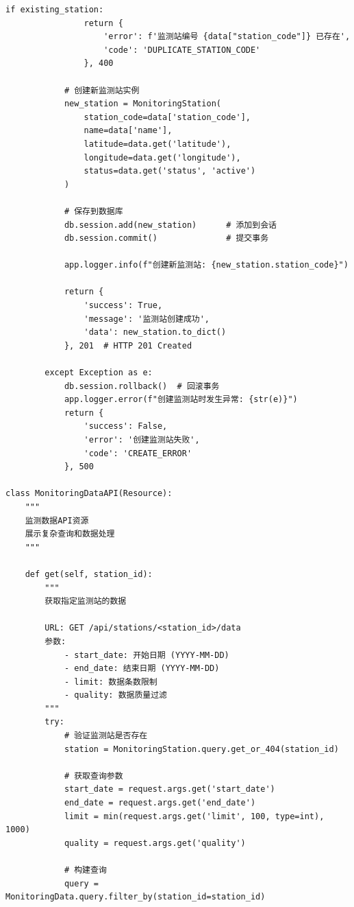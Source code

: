 \begin{lstlisting}[style=python]
            if existing_station:
                return {
                    'error': f'监测站编号 {data["station_code"]} 已存在',
                    'code': 'DUPLICATE_STATION_CODE'
                }, 400
            
            # 创建新监测站实例
            new_station = MonitoringStation(
                station_code=data['station_code'],
                name=data['name'],
                latitude=data.get('latitude'),
                longitude=data.get('longitude'),
                status=data.get('status', 'active')
            )
            
            # 保存到数据库
            db.session.add(new_station)      # 添加到会话
            db.session.commit()              # 提交事务
            
            app.logger.info(f"创建新监测站: {new_station.station_code}")
            
            return {
                'success': True,
                'message': '监测站创建成功',
                'data': new_station.to_dict()
            }, 201  # HTTP 201 Created
            
        except Exception as e:
            db.session.rollback()  # 回滚事务
            app.logger.error(f"创建监测站时发生异常: {str(e)}")
            return {
                'success': False,
                'error': '创建监测站失败',
                'code': 'CREATE_ERROR'
            }, 500

class MonitoringDataAPI(Resource):
    """
    监测数据API资源
    展示复杂查询和数据处理
    """
    
    def get(self, station_id):
        """
        获取指定监测站的数据
        
        URL: GET /api/stations/<station_id>/data
        参数:
            - start_date: 开始日期 (YYYY-MM-DD)
            - end_date: 结束日期 (YYYY-MM-DD)
            - limit: 数据条数限制
            - quality: 数据质量过滤
        """
        try:
            # 验证监测站是否存在
            station = MonitoringStation.query.get_or_404(station_id)
            
            # 获取查询参数
            start_date = request.args.get('start_date')
            end_date = request.args.get('end_date')
            limit = min(request.args.get('limit', 100, type=int), 1000)
            quality = request.args.get('quality')
            
            # 构建查询
            query = MonitoringData.query.filter_by(station_id=station_id)
            

\end{lstlisting}

